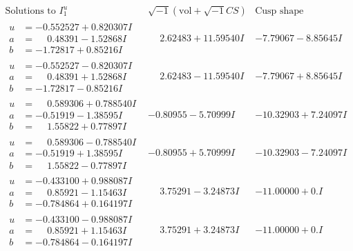 \documentclass[1p]{elsarticle_modified}
\theoremstyle{definition}
\newcommand{\I}{\sqrt{-1}}
\begin{document}
$$\begin{array}{c|c|c}  
\text{Solutions to }I^u_{1}& \I (\text{vol} + \sqrt{-1}CS) & \text{Cusp shape}\\
 \hline 
\begin{aligned}
u &= -0.552527 + 0.820307 I \\
a &= \phantom{-}0.48391 - 1.52868 I \\
b &= -1.72817 + 0.85216 I\end{aligned}
 & \phantom{-}2.62483 + 11.59540 I & -7.79067 - 8.85645 I \\ \hline\begin{aligned}
u &= -0.552527 - 0.820307 I \\
a &= \phantom{-}0.48391 + 1.52868 I \\
b &= -1.72817 - 0.85216 I\end{aligned}
 & \phantom{-}2.62483 - 11.59540 I & -7.79067 + 8.85645 I \\ \hline\begin{aligned}
u &= \phantom{-}0.589306 + 0.788540 I \\
a &= -0.51919 - 1.38595 I \\
b &= \phantom{-}1.55822 + 0.77897 I\end{aligned}
 & -0.80955 - 5.70999 I & -10.32903 + 7.24097 I \\ \hline\begin{aligned}
u &= \phantom{-}0.589306 - 0.788540 I \\
a &= -0.51919 + 1.38595 I \\
b &= \phantom{-}1.55822 - 0.77897 I\end{aligned}
 & -0.80955 + 5.70999 I & -10.32903 - 7.24097 I \\ \hline\begin{aligned}
u &= -0.433100 + 0.988087 I \\
a &= \phantom{-}0.85921 - 1.15463 I \\
b &= -0.784864 + 0.164197 I\end{aligned}
 & \phantom{-}3.75291 - 3.24873 I & -11.00000 + 0. I\phantom{ +0.000000I} \\ \hline\begin{aligned}
u &= -0.433100 - 0.988087 I \\
a &= \phantom{-}0.85921 + 1.15463 I \\
b &= -0.784864 - 0.164197 I\end{aligned}
 & \phantom{-}3.75291 + 3.24873 I & -11.00000 + 0. I\phantom{ +0.000000I} \\ \hline\begin{aligned}

\end{aligned}
\end{array}$$
\end{document}
